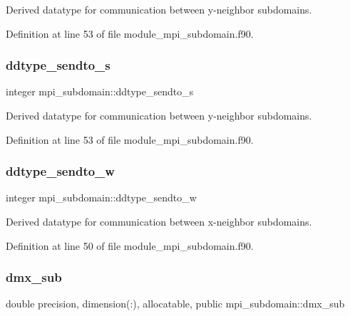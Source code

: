 Derived datatype for communication between y-\/neighbor subdomains. 



Definition at line 53 of file module\+\_\+mpi\+\_\+subdomain.\+f90.

\mbox{\label{namespacempi__subdomain_a660f83d621188fb7eb60ad10eab4c9b5}} 
\subsubsection{\texorpdfstring{ddtype\_sendto\_s}{ddtype\_sendto\_s}}
{\footnotesize\ttfamily integer mpi\+\_\+subdomain\+::ddtype\+\_\+sendto\+\_\+s}



Derived datatype for communication between y-\/neighbor subdomains. 



Definition at line 53 of file module\+\_\+mpi\+\_\+subdomain.\+f90.

\mbox{\label{namespacempi__subdomain_a0701fde01daea1a6fd51b62c75b8ee82}} 
\subsubsection{\texorpdfstring{ddtype\_sendto\_w}{ddtype\_sendto\_w}}
{\footnotesize\ttfamily integer mpi\+\_\+subdomain\+::ddtype\+\_\+sendto\+\_\+w}



Derived datatype for communication between x-\/neighbor subdomains. 



Definition at line 50 of file module\+\_\+mpi\+\_\+subdomain.\+f90.

\mbox{\label{namespacempi__subdomain_a56af1740899dc9df6868e5e71a0884a5}} 
\subsubsection{\texorpdfstring{dmx\_sub}{dmx\_sub}}
{\footnotesize\ttfamily double precision, dimension(\+:), allocatable, public mpi\+\_\+subdomain\+::dmx\+\_\+sub}



